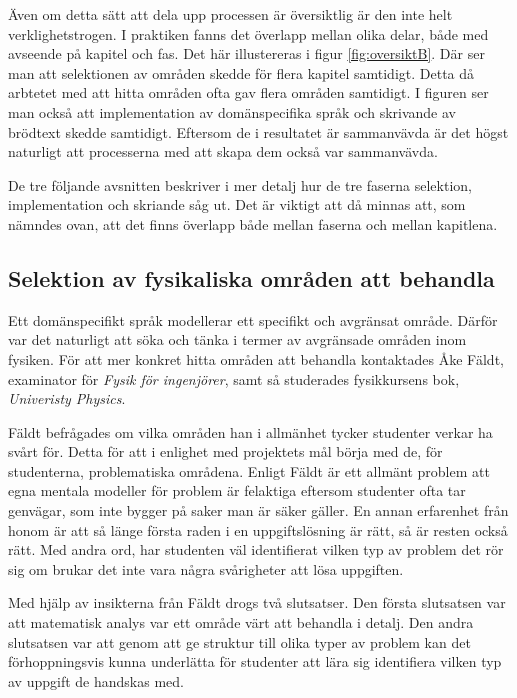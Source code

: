 \begin{binge}
Även om detta sätt att dela upp processen är översiktlig är den inte helt verklighetstrogen. I praktiken fanns det överlapp mellan olika delar, både med avseende på kapitel och fas. Det här illustereras i figur \ref{fig:oversiktB}. Där ser man att selektionen av områden skedde för flera kapitel samtidigt. Detta då arbtetet med att hitta områden ofta gav flera områden samtidigt. I figuren ser man också att implementation av domänspecifika språk och skrivande av brödtext skedde samtidigt. Eftersom de i resultatet är sammanvävda är det högst naturligt att processerna med att skapa dem också var sammanvävda.

De tre följande avsnitten beskriver i mer detalj hur de tre faserna selektion, implementation och skriande såg ut. Det är viktigt att då minnas att, som nämndes ovan, att det finns överlapp både mellan faserna och mellan kapitlena.

\subsection{Selektion av fysikaliska områden att behandla}
\label{sec:selektion}

Ett domänspecifikt språk modellerar ett specifikt och avgränsat område. Därför var det naturligt att söka och tänka i termer av avgränsade områden inom fysiken. För att mer konkret hitta områden att behandla kontaktades Åke Fäldt, examinator för \textit{Fysik för ingenjörer}, samt så studerades fysikkursens bok, \textit{Univeristy Physics}.

Fäldt befrågades om vilka områden han i allmänhet tycker studenter verkar ha svårt för. Detta för att i enlighet med projektets mål börja med de, för studenterna, problematiska områdena. Enligt Fäldt är ett allmänt problem att egna mentala modeller för problem är felaktiga eftersom studenter ofta tar genvägar, som inte bygger på saker man är säker gäller. En annan erfarenhet från honom är att så länge första raden i en uppgiftslösning är rätt, så är resten också rätt. Med andra ord, har studenten väl identifierat vilken typ av problem det rör sig om brukar det inte vara några svårigheter att lösa uppgiften.

Med hjälp av insikterna från Fäldt drogs två slutsatser. Den första slutsatsen var att matematisk analys var ett område värt att behandla i detalj. Den andra slutsatsen var att genom att ge struktur till olika typer av problem kan det förhoppningsvis kunna underlätta för studenter att lära sig identifiera vilken typ av uppgift de handskas med.


\end{binge}
